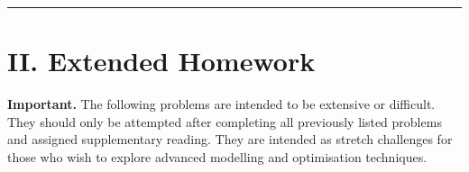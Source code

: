 \documentclass[11pt]{article}
\begin{document}
\vspace{1em}
\hrule
\vspace{1em}

\section*{II. Extended Homework}

\textbf{Important.} The following problems are intended to be extensive or difficult.  
They should only be attempted after completing all previously listed problems and assigned supplementary reading.  
They are intended as stretch challenges for those who wish to explore advanced modelling and optimisation techniques.

\medskip

\vspace{0.8em}
\end{document}
